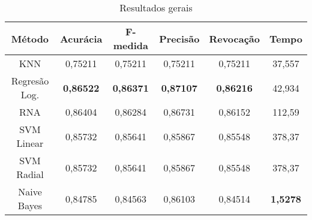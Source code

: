 \begin{table}[h]
\centering
\caption{Resultados gerais}
\vspace{0.2cm}
\begin{tabular}{c|c|c|c|c|c}
Método & Acurácia & F-medida & Precisão & Revocação & Tempo \\
\hline
KNN                & 0,75211 & 0,75211 & 0,75211 & 0,75211 & 37,557 \\
Regresão Log. & \textbf{0,86522} & \textbf{0,86371} & \textbf{0,87107} & \textbf{0,86216} & 42,934 \\
RNA                & 0,86404 & 0,86284 & 0,86731 & 0,86152 & 112,59 \\
SVM Linear         & 0,85732 & 0,85641 & 0,85867 & 0,85548 & 378,37 \\
SVM Radial         & 0,85732 & 0,85641 & 0,85867 & 0,85548 & 378,37 \\
Naive Bayes        & 0,84785 & 0,84563 & 0,86103 & 0,84514 & \textbf{1,5278} \\
\end{tabular}
\label{table:resultadosGerais}
\end{table}


